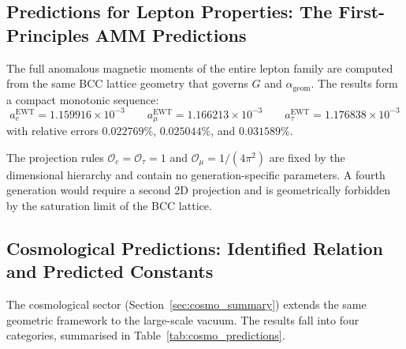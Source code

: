 \documentclass[10pt,a4paper]{article}
\begin{document}
\subsection{Predictions for Lepton Properties: The First-Principles AMM Predictions}
\label{sec:lepton_predictions_pp}

The full anomalous magnetic moments of the entire lepton family are computed from the same BCC lattice geometry that governs \(G\) and \(\alpha_{\text{geom}}\). The results form a compact monotonic sequence:
\begin{equation}
	\boxed{a_e^{\text{EWT}} = 1.159916 \times 10^{-3}}
	\qquad
	\boxed{a_\mu^{\text{EWT}} = 1.166213 \times 10^{-3}}
	\qquad
	\boxed{a_\tau^{\text{EWT}} = 1.176838 \times 10^{-3}}
\end{equation}
with relative errors \(0.022769\%\), \(0.025044\%\), and \(0.031589\%\).

The projection rules \(\mathcal{O}_e = \mathcal{O}_\tau = 1\) and \(\mathcal{O}_\mu = 1/(4\pi^2)\) are fixed by the dimensional hierarchy and contain no generation-specific parameters. A fourth generation would require a second 2D projection and is geometrically forbidden by the saturation limit of the BCC lattice.

\subsection{Cosmological Predictions: Identified Relation and Predicted Constants}
\label{sec:cosmo_predictions_pp}

The cosmological sector (Section~\ref{sec:cosmo_summary}) extends the
same geometric framework to the large-scale vacuum. The results fall
into four categories, summarised in Table~\ref{tab:cosmo_predictions}.
\end{document}
